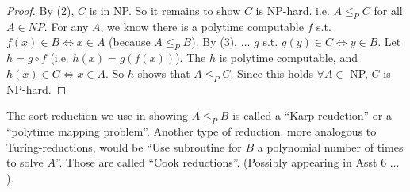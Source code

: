 \begin{proof}
    By (2), $C$ is in NP. So it remains to show $C$ is NP-hard. i.e. $A \leq_{P} C$ for all $A \in NP$. For any $A$, we know there is a polytime computable $f$ s.t. $f(x) \in B \Leftrightarrow x \in A$ (because $A \leq_{P} B$). By (3), $\ldots$ $g$  s.t. $g(y) \in C \Leftrightarrow y \in B$. Let $h = g \circ f$ (i.e. $h(x) = g(f(x))$). The $h$ is polytime computable, and $h(x) \in C \Leftrightarrow x \in A$. So $h$ shows that $A \leq_{P} C$. Since this holds $\forall A \in$ NP, $C$ is NP-hard.
\end{proof}

The sort reduction we use in showing $A \leq_{P} B$ is called a ``Karp reudction'' or a ``polytime mapping problem''. Another type of reduction. more analogous to Turing-reductions, would be ``Use subroutine for $B$ a polynomial number of times to solve $A$''. Those are called ``Cook reductions''. (Possibly appearing in Asst 6 $\dots$).
